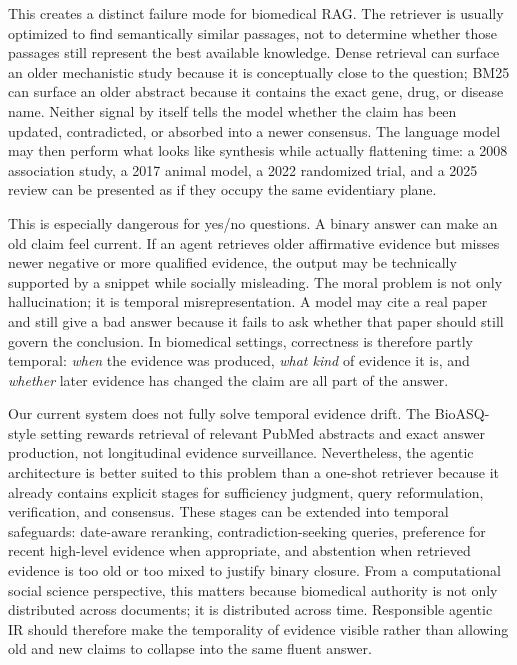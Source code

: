 \documentclass[sigconf,nonacm]{acmart}
\begin{document}
This creates a distinct failure mode for biomedical RAG. The retriever is usually optimized to find semantically similar passages, not to determine whether those passages still represent the best available knowledge. Dense retrieval can surface an older mechanistic study because it is conceptually close to the question; BM25 can surface an older abstract because it contains the exact gene, drug, or disease name. Neither signal by itself tells the model whether the claim has been updated, contradicted, or absorbed into a newer consensus. The language model may then perform what looks like synthesis while actually flattening time: a 2008 association study, a 2017 animal model, a 2022 randomized trial, and a 2025 review can be presented as if they occupy the same evidentiary plane.

This is especially dangerous for yes/no questions. A binary answer can make an old claim feel current. If an agent retrieves older affirmative evidence but misses newer negative or more qualified evidence, the output may be technically supported by a snippet while socially misleading. The moral problem is not only hallucination; it is temporal misrepresentation. A model may cite a real paper and still give a bad answer because it fails to ask whether that paper should still govern the conclusion. In biomedical settings, correctness is therefore partly temporal: \emph{when} the evidence was produced, \emph{what kind} of evidence it is, and \emph{whether} later evidence has changed the claim are all part of the answer.

Our current system does not fully solve temporal evidence drift. The BioASQ-style setting rewards retrieval of relevant PubMed abstracts and exact answer production, not longitudinal evidence surveillance. Nevertheless, the agentic architecture is better suited to this problem than a one-shot retriever because it already contains explicit stages for sufficiency judgment, query reformulation, verification, and consensus. These stages can be extended into temporal safeguards: date-aware reranking, contradiction-seeking queries, preference for recent high-level evidence when appropriate, and abstention when retrieved evidence is too old or too mixed to justify binary closure. From a computational social science perspective, this matters because biomedical authority is not only distributed across documents; it is distributed across time. Responsible agentic IR should therefore make the temporality of evidence visible rather than allowing old and new claims to collapse into the same fluent answer.
\end{document}
